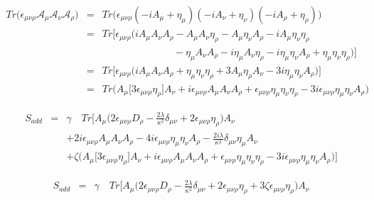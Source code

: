 \documentclass[10pt]{book}
\theoremstyle{break}
\begin{document}
\begin{eqnarray*}
 Tr \big( \epsilon_{\mu \nu \rho} \mathcal{A}_{\mu} \mathcal{A}_{\nu} \mathcal{A}_{\rho} \big) &=& Tr \bigg( \epsilon_{\mu \nu \rho} ( -i A_\mu + \eta_\mu ) ( -i A_\nu + \eta_\nu ) ( -i A_\rho + \eta_\rho ) \bigg) \nonumber \\
 &=& Tr \bigg[ \epsilon_{\mu \nu \rho} \bigg( i A_\mu A_\nu A_\rho - A_\mu A_\nu \eta_\rho - A_\mu \eta_\nu A_\rho - i A_\mu \eta_\nu \eta_\rho  \nonumber\\
 && \hspace{3cm} - \eta_\mu A_\nu A_\rho - i \eta_\mu A_\nu \eta_\rho - i \eta_\mu \eta_\nu A_\rho +  \eta_\mu \eta_\nu \eta_\rho  \bigg) \bigg] \nonumber \\
 &=& Tr \bigg[ \epsilon_{\mu \nu \rho} \bigg( i A_\mu A_\nu A_\rho + \eta_\mu \eta_\nu \eta_\rho  + 3 A_\mu \eta_\rho A_\nu - 3 i \eta_\mu \eta_\nu A_\rho \bigg) \bigg] \nonumber \\
 &=& Tr \bigg(  A_\mu \big[ 3 \epsilon_{\mu \nu \rho} \eta_\rho \big] A_\nu + i \epsilon_{\mu \nu \rho} A_\mu A_\nu A_\rho + \epsilon_{\mu \nu \rho} \eta_{\mu} \eta_\nu \eta_\rho - 3i \epsilon_{\mu \nu \rho} \eta_\mu \eta_\nu A_\rho \bigg) \nonumber 
\end{eqnarray*}




\begin{eqnarray*}
 S_{add} &=& \gamma \quad Tr \Bigg[ A_\mu \bigg( 2 \epsilon_{\mu \nu \rho} D_\rho - \frac{2 \lambda}{\kappa^{2}} \delta_{\mu \nu} + 2 \epsilon_{\mu \nu \rho} \eta_{\rho} \bigg) A_\nu \nonumber \\
 &&  + 2i \epsilon_{\mu \nu \rho} A_\mu A_\nu A_\rho - 4 i \epsilon_{\mu \nu \rho} \eta_\mu \eta_\nu A_\rho - \frac{2i \lambda}{\kappa^2} \delta_{\mu \nu} \eta_\mu A_\nu \nonumber \\
 && + \zeta \bigg( A_\mu \big[ 3 \epsilon_{\mu \nu \rho} \eta_\rho \big] A_\nu + i \epsilon_{\mu \nu \rho} A_\mu A_\nu A_\rho + \epsilon_{\mu \nu \rho} \eta_{\mu} \eta_\nu \eta_\rho - 3i \epsilon_{\mu \nu \rho} \eta_\mu \eta_\nu A_\rho \bigg) \Bigg] \nonumber 
 \end{eqnarray*}
 

 \begin{eqnarray*} 
 S_{add}  &=& \gamma \quad Tr \Bigg[ A_\mu \bigg( 2 \epsilon_{\mu \nu \rho} D_\rho - \frac{2 \lambda}{\kappa^{2}} \delta_{\mu \nu} + 2 \epsilon_{\mu \nu \rho} \eta_{\rho} + 3 \zeta \epsilon_{\mu \nu \rho} \eta_\rho \bigg) A_\nu 
  \end{eqnarray*}
 
\end{document}
